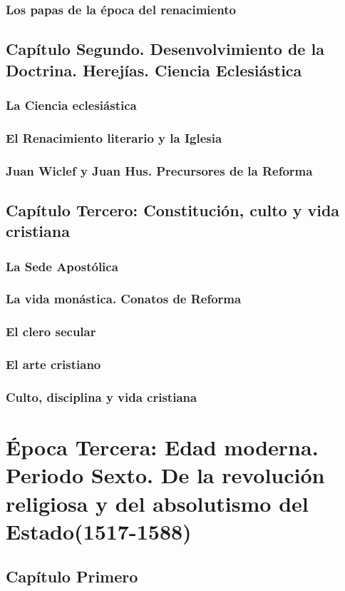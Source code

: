 \raggedbottom{} \documentclass[12pt, a4paper]{book}
\begin{document}
\section{Los papas de la época del renacimiento}
\chapter{Capítulo Segundo. Desenvolvimiento de la Doctrina. Herejías. Ciencia Eclesiástica}
\section{La Ciencia eclesiástica}
\section{El Renacimiento literario y la Iglesia}
\section{Juan Wiclef y Juan Hus. Precursores de la Reforma}
\chapter{Capítulo Tercero: Constitución, culto y vida cristiana}
\section{La Sede Apostólica}
\section{La vida monástica. Conatos de Reforma}
\section{El clero secular}
\section{El arte cristiano}
\section{Culto, disciplina y vida cristiana}
\part{Época Tercera: Edad moderna. Periodo Sexto. De la revolución religiosa y del absolutismo del Estado(1517-1588)}
\chapter{Capítulo Primero}
\end{document}
